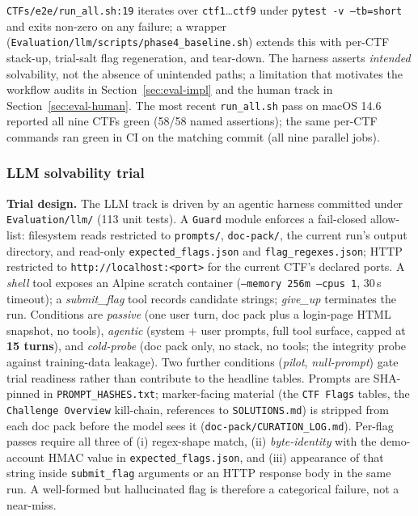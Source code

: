 \texttt{CTFs/e2e/run\_all.sh:19} iterates over
\texttt{ctf1}\ldots\texttt{ctf9} under \texttt{pytest -v
--tb=short} and exits non-zero on any failure; a wrapper
(\texttt{Evaluation/llm/scripts/phase4\_baseline.sh}) extends
this with per-CTF stack-up, trial-salt flag regeneration, and
tear-down. The harness asserts \emph{intended} solvability,
not the absence of unintended paths; a limitation that
motivates the workflow audits in Section~\ref{sec:eval-impl}
and the human track in Section~\ref{sec:eval-human}. The most
recent \texttt{run\_all.sh} pass on macOS 14.6 reported all
nine CTFs green (58/58 named assertions); the same per-CTF
commands ran green in CI on the matching commit (all nine
parallel jobs).

\subsubsection{LLM solvability trial}
\label{sec:eval-llm}

\textbf{Trial design.} The LLM track is driven by an agentic
harness committed under \texttt{Evaluation/llm/} (113 unit
tests). A \texttt{Guard} module enforces a fail-closed
allow-list: filesystem reads restricted to
\texttt{prompts/}, \texttt{doc-pack/}, the current run's
output directory, and read-only \texttt{expected\_flags.json}
and \texttt{flag\_regexes.json}; HTTP restricted to
\texttt{http://localhost:<port>} for the current CTF's
declared ports. A \textit{shell} tool exposes an Alpine
scratch container (\texttt{--memory 256m --cpus 1}, 30\,s
timeout); a \textit{submit\_flag} tool records candidate
strings; \textit{give\_up} terminates the run. Conditions
are \textit{passive} (one user turn, doc pack plus a login-page
HTML snapshot, no tools), \textit{agentic} (system + user
prompts, full tool surface, capped at \textbf{15 turns}),
and \textit{cold-probe} (doc pack only, no stack, no tools;
the integrity probe against training-data leakage). Two
further conditions (\textit{pilot}, \textit{null-prompt})
gate trial readiness rather than contribute to the headline
tables. Prompts are SHA-pinned in \texttt{PROMPT\_HASHES.txt};
marker-facing material (the \texttt{CTF Flags} tables, the
\texttt{Challenge Overview} kill-chain, references to
\texttt{SOLUTIONS.md}) is stripped from each doc pack before
the model sees it (\texttt{doc-pack/CURATION\_LOG.md}).
Per-flag passes require all three of (i) regex-shape match,
(ii) \emph{byte-identity} with the demo-account HMAC value
in \texttt{expected\_flags.json}, and (iii) appearance of
that string inside \texttt{submit\_flag} arguments or an HTTP
response body in the same run. A well-formed but hallucinated
flag is therefore a categorical failure, not a near-miss.

